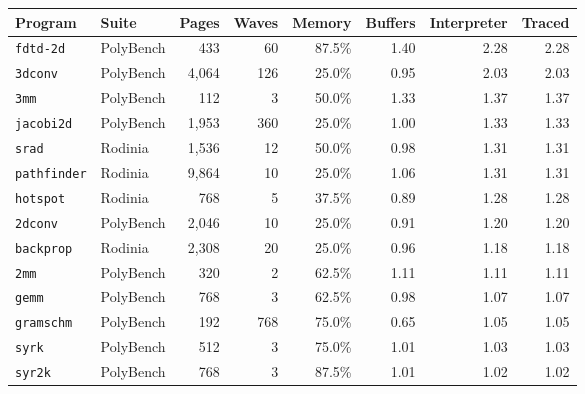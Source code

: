 \begin{tabular}{llrrrrrr}
\toprule
Program & Suite & Pages & Waves & Memory & Buffers & Interpreter & Traced \\
\midrule
\texttt{fdtd-2d} & PolyBench & 433 & 60 & 87.5\% & 1.40 & 2.28 & 2.28 \\
\texttt{3dconv} & PolyBench & 4,064 & 126 & 25.0\% & 0.95 & 2.03 & 2.03 \\
\texttt{3mm} & PolyBench & 112 & 3 & 50.0\% & 1.33 & 1.37 & 1.37 \\
\texttt{jacobi2d} & PolyBench & 1,953 & 360 & 25.0\% & 1.00 & 1.33 & 1.33 \\
\texttt{srad} & Rodinia & 1,536 & 12 & 50.0\% & 0.98 & 1.31 & 1.31 \\
\texttt{pathfinder} & Rodinia & 9,864 & 10 & 25.0\% & 1.06 & 1.31 & 1.31 \\
\texttt{hotspot} & Rodinia & 768 & 5 & 37.5\% & 0.89 & 1.28 & 1.28 \\
\texttt{2dconv} & PolyBench & 2,046 & 10 & 25.0\% & 0.91 & 1.20 & 1.20 \\
\texttt{backprop} & Rodinia & 2,308 & 20 & 25.0\% & 0.96 & 1.18 & 1.18 \\
\texttt{2mm} & PolyBench & 320 & 2 & 62.5\% & 1.11 & 1.11 & 1.11 \\
\texttt{gemm} & PolyBench & 768 & 3 & 62.5\% & 0.98 & 1.07 & 1.07 \\
\texttt{gramschm} & PolyBench & 192 & 768 & 75.0\% & 0.65 & 1.05 & 1.05 \\
\texttt{syrk} & PolyBench & 512 & 3 & 75.0\% & 1.01 & 1.03 & 1.03 \\
\texttt{syr2k} & PolyBench & 768 & 3 & 87.5\% & 1.01 & 1.02 & 1.02 \\
\bottomrule
\end{tabular}

